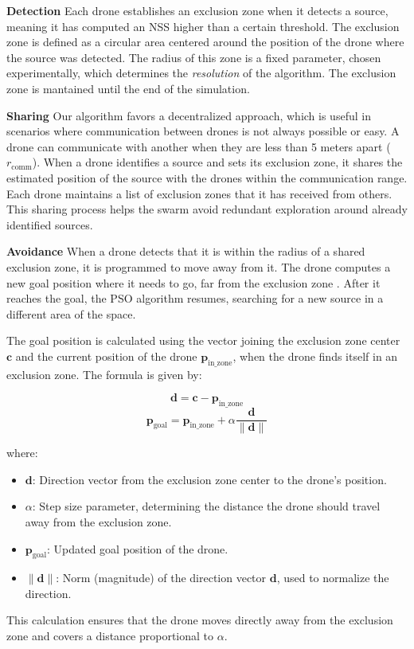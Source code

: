 \textbf{Detection}
Each drone establishes an exclusion zone when it detects a 
source, meaning it has computed an NSS higher than a certain 
threshold. The exclusion zone is defined as a circular area 
centered around the position of the drone where the source 
was detected. The radius of this zone is a fixed parameter, 
chosen experimentally, which determines the \textit{resolution} 
of the algorithm. The exclusion zone is mantained until the end 
of the simulation.

\textbf{Sharing}
Our algorithm favors a decentralized approach, which is useful 
in scenarios where communication between drones is not always 
possible or easy. A drone can communicate with another when 
they are less than 5 meters apart (\(r_{\text{comm}}\)).
When a drone identifies a source 
and sets its exclusion zone, it shares the estimated position 
of the source with the drones within the communication range. 
Each drone maintains a list of exclusion zones that it has 
received from others. This sharing process helps the swarm 
avoid redundant exploration around already identified sources.

\textbf{Avoidance}
When a drone detects that it is within the radius of a shared 
exclusion zone, it is programmed to move away from it. 
The drone computes a new goal position where it needs to go, far from the 
exclusion zone . After it reaches the goal, 
the PSO algorithm resumes, searching for a new source 
in a different area of the space.

The goal position is calculated using the vector joining 
the exclusion zone center \(\mathbf{c}\) and the current 
position of the drone \(\mathbf{p}_{\text{in\_zone}}\), when the drone finds itself 
in an exclusion zone. The formula is given by:

\[
\mathbf{d} = \mathbf{c} - \mathbf{p}_{\text{in\_zone}}
\]
\[
\mathbf{p}_{\text{goal}} = \mathbf{p}_{\text{in\_zone}} + \alpha \frac{\mathbf{d}}{\|\mathbf{d}\|}
\] \label{eq:move_away}

where:
\begin{itemize}
    \item \(\mathbf{d}\): Direction vector from the exclusion 
    zone center to the drone's position.
    \item \(\alpha\): Step size parameter, determining the 
    distance the drone should travel away from the exclusion zone.
    \item \(\mathbf{p}_{\text{goal}}\): Updated goal position of the drone.
    \item \(\|\mathbf{d}\|\): Norm (magnitude) of the direction 
    vector \(\mathbf{d}\), used to normalize the direction.
\end{itemize}
This calculation ensures that the drone moves directly away 
from the exclusion zone and covers a distance proportional 
to \(\alpha\). 
\\


